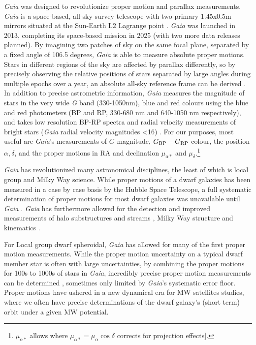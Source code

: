 \emph{Gaia} was designed to revolutionize proper motion and parallax
measurements. \emph{Gaia} is a space-based, all-sky survey telescope
with two primary 1.45x0.5m mirrors situated at the Sun-Earth L2 Lagrange
point \citep{gaiacollaboration+2016}. \emph{Gaia} was launched in 2013,
completing its space-based mission in 2025 (with two more data releases
planned). By imagining two patches of sky on the same focal plane,
separated by a fixed angle of 106.5 degrees, \emph{Gaia} is able to
measure absolute proper motions. Stars in different regions of the sky
are affected by parallax differently, so by precisely observing the
relative positions of stars separated by large angles during multiple
epochs over a year, an absolute all-sky reference frame can be derived
\citep{gaiacollaboration+2016}. In addition to precise astrometric
information, \emph{Gaia} measures the magnitude of stars in the very
wide \emph{G} band (330-1050nm), blue and red colours using the blue and
red photometers (BP and RP, 330-680 nm and 640-1050 nm respectively),
and takes low resolution BP-RP spectra and radial velocity measurements
of bright stars (\emph{Gaia} radial velocity magnitudes \textless16)
\citep{gaiacollaboration+2016}. For our purposes, most useful are
\emph{Gaia}'s measurements of \(G\) magnitude,
\(G_{\rm BP} - G_{\rm RP}\) colour, the position \(\alpha, \delta\), and
the proper motions in RA and declination \(\mu_{\alpha*}\) and
\(\mu_\delta\).\footnote{\(\mu_{\alpha*}\) allows where
  \(\mu_{\alpha*} = \mu_\alpha \cos \delta\) corrects for projection
  effects{]}.}

\emph{Gaia} has revolutionized many astronomical disciplines, the least
of which is local group and Milky Way science. While proper motions of a
dwarf galaxies has been measured in a case by case basis by the Hubble
Space Telescope, a full systematic determination of proper motions for
most dwarf galaxies was unavailable until \emph{Gaia}
\citep{MV2020a, battaglia+2022}. \emph{Gaia} has furthermore allowed for
the detection and improved measurements of halo substructures and
streams \citep{bonaca+price-whelan2025}, Milky Way structure and
kinematics \citep{hunt+vasiliev2025}.

For Local group dwarf spheroidal, \emph{Gaia} has allowed for many of
the first proper motion measurements. While the proper motion
uncertainty on a typical dwarf member star is often with large
uncertainties, by combining the proper motions for 100s to 1000s of
stars in \emph{Gaia}, incredibly precise proper motion measurements can
be determined \citep[e.g.][]{MV2020a}, sometimes only limited by
\emph{Gaia}'s systematic error floor. Proper motions have ushered in a
new dynamical era for MW satellites studies, where we often have precise
determinations of the dwarf galaxy's (short term) orbit under a given MW
potential.

